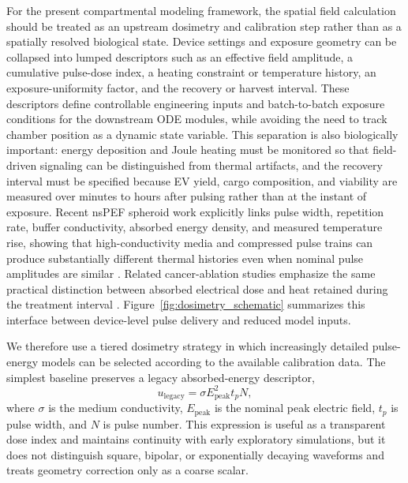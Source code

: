 \documentclass[Afour,sagev,times]{sagej}
\begin{document}
For the present compartmental modeling framework, the spatial field calculation should be treated as an upstream dosimetry and calibration step rather than as a spatially resolved biological state. Device settings and exposure geometry can be collapsed into lumped descriptors such as an effective field amplitude, a cumulative pulse-dose index, a heating constraint or temperature history, an exposure-uniformity factor, and the recovery or harvest interval. These descriptors define controllable engineering inputs and batch-to-batch exposure conditions for the downstream ODE modules, while avoiding the need to track chamber position as a dynamic state variable. This separation is also biologically important: energy deposition and Joule heating must be monitored so that field-driven signaling can be distinguished from thermal artifacts, and the recovery interval must be specified because EV yield, cargo composition, and viability are measured over minutes to hours after pulsing rather than at the instant of exposure. Recent nsPEF spheroid work explicitly links pulse width, repetition rate, buffer conductivity, absorbed energy density, and measured temperature rise, showing that high-conductivity media and compressed pulse trains can produce substantially different thermal histories even when nominal pulse amplitudes are similar \cite{orlacchio2023effects}. Related cancer-ablation studies emphasize the same practical distinction between absorbed electrical dose and heat retained during the treatment interval \cite{gudvangen2022electroporation}. Figure~\ref{fig:dosimetry_schematic} summarizes this interface between device-level pulse delivery and reduced model inputs.

We therefore use a tiered dosimetry strategy in which increasingly detailed pulse-energy models can be selected according to the available calibration data. The simplest baseline preserves a legacy absorbed-energy descriptor,
\begin{equation}
u_{\mathrm{legacy}}=\sigma E_{\mathrm{peak}}^{2}t_pN ,
\end{equation}
where $\sigma$ is the medium conductivity, $E_{\mathrm{peak}}$ is the nominal peak electric field, $t_p$ is pulse width, and $N$ is pulse number. This expression is useful as a transparent dose index and maintains continuity with early exploratory simulations, but it does not distinguish square, bipolar, or exponentially decaying waveforms and treats geometry correction only as a coarse scalar.
\end{document}
